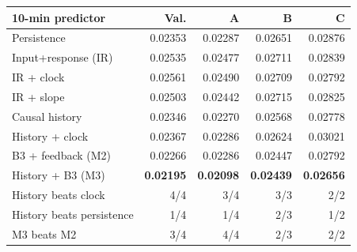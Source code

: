 \begin{tabular}{lrrrr}
\toprule
10-min predictor & Val. & A & B & C \\
\midrule
Persistence & 0.02353 & 0.02287 & 0.02651 & 0.02876 \\
Input+response (IR) & 0.02535 & 0.02477 & 0.02711 & 0.02839 \\
IR + clock & 0.02561 & 0.02490 & 0.02709 & 0.02792 \\
IR + slope & 0.02503 & 0.02442 & 0.02715 & 0.02825 \\
Causal history & 0.02346 & 0.02270 & 0.02568 & 0.02778 \\
History + clock & 0.02367 & 0.02286 & 0.02624 & 0.03021 \\
B3 + feedback (M2) & 0.02266 & 0.02286 & 0.02447 & 0.02792 \\
History + B3 (M3) & \textbf{0.02195} & \textbf{0.02098} & \textbf{0.02439} & \textbf{0.02656} \\
\midrule
History beats clock & 4/4 & 3/4 & 3/3 & 2/2 \\
History beats persistence & 1/4 & 1/4 & 2/3 & 1/2 \\
M3 beats M2 & 3/4 & 4/4 & 2/3 & 2/2 \\
\bottomrule
\end{tabular}
